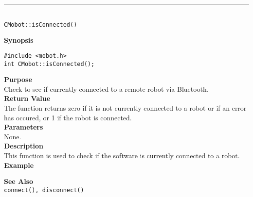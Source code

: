 \noindent
\vspace{5pt}
\rule{4.5in}{0.015in}\\
\noindent
{\LARGE \texttt{CMobot::isConnected()}}\\
{}

\noindent
{\bf Synopsis}
\vspace{-8pt}
\begin{verbatim}
#include <mobot.h>
int CMobot::isConnected();
\end{verbatim}

\noindent
{\bf Purpose}\\
Check to see if currently connected to a remote robot via Bluetooth.\\

\noindent
{\bf Return Value}\\
The function returns zero if it is not currently connected to a robot or if an 
error has occured, or 1 if the robot is connected.\\

\noindent
{\bf Parameters}\\
None.\\

\noindent
{\bf Description}\\
This function is used to check if the software is currently connected to
a robot.\\

\noindent
{\bf Example}\\
\noindent

\noindent
{\bf See Also}\\
\texttt{connect(), disconnect()}
